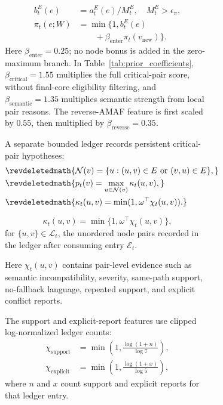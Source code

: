 \documentclass[11pt]{article}
\begin{document}
\begin{figure}[!t]
\begin{figure}[!t]
\begin{revadded}
\[\begin{aligned}
b_t^E(e)&=a_t^E(e)/M_t^E,\quad M_t^E>\epsilon_\pi,\\
\pi_t(e;W)&=\min\{1,b_t^E(e)\\
&\qquad+\beta_{\mathrm{enter}}\pi_t(v_{\mathrm{new}})\}.
\end{aligned}
\]
Here $\beta_{\mathrm{enter}}=0.25$; no node bonus is added in the zero-maximum branch.  In Table~\ref{tab:prior_coefficients}, $\beta_{\mathrm{critical}}=1.55$ multiplies the full critical-pair score, without final-core eligibility filtering, and $\beta_{\mathrm{semantic}}=1.35$ multiplies semantic strength from local pair reasons. The reverse-AMAF feature is first scaled by $0.55$, then multiplied by $\beta_{\mathrm{reverse}}=0.35$.
\end{revadded}
A separate bounded ledger records persistent critical-pair hypotheses:
\ifrevisionmarks
\[
    \begin{aligned}
    &\revdeletedmath{\mathcal N(v)=\{u:(u,v)\in E\text{ or }(v,u)\in E\},}\\
    &\revdeletedmath{p_t(v)=\max_{u\in\mathcal N(v)}\kappa_t(u,v),}\\
    &\revdeletedmath{\kappa_t(u,v)=\min(1,\omega^\top\chi_t(u,v)).}
    \end{aligned}
\]
\fi
\begin{revadded}
\begin{equation}
    \kappa_t(u,v)=\min\{1,\omega^\top\chi_t(u,v)\},
    \label{eq:critical-pair}
\end{equation}
for $\{u,v\}\in\mathcal L_t$, the unordered node pairs recorded in the ledger after consuming entry $\mathcal E_t$.
\end{revadded}
Here $\chi_t(u,v)$ contains pair-level evidence such as semantic incompatibility, severity, same-path support, no-fallback language, repeated support, and explicit conflict reports.
\begin{revadded}
The support and explicit-report features use clipped log-normalized ledger counts:
\[
\begin{aligned}
\chi_{\mathrm{support}}&=\min\left(1,\frac{\log(1+n)}{\log 7}\right),\\
\chi_{\mathrm{explicit}}&=\min\left(1,\frac{\log(1+x)}{\log 5}\right),
\end{aligned}
\]
where $n$ and $x$ count support and explicit reports for that ledger entry.
\end{revadded}


\end{figure}
\end{figure}
\end{document}

